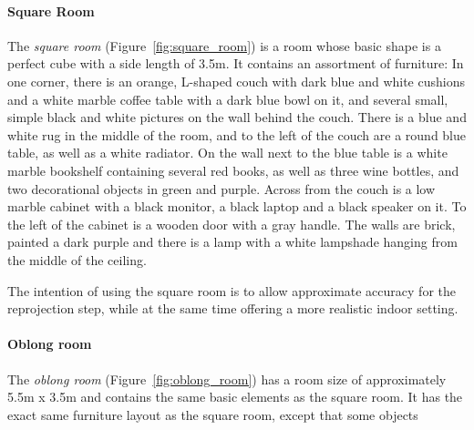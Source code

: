 \paragraph{Square Room}
The \emph{square room} (Figure~\ref{fig:square_room}) is a room whose basic shape is a perfect cube with a side length of 3.5m. It contains an assortment of furniture\footnotemark: In one corner, there is an orange, L-shaped couch with dark blue and white cushions and a white marble coffee table with a dark blue bowl on it, and several small, simple black and white pictures on the wall behind the couch. There is a blue and white rug in the middle of the room, and to the left of the couch are a round blue table, as well as a white radiator. On the wall next to the blue table is a white marble bookshelf containing several red books, as well as three wine bottles, and two decorational objects in green and purple. Across from the couch is a low marble cabinet with a black monitor, a black laptop and a black speaker on it. To the left of the cabinet is a wooden door with a gray handle. The walls are brick, painted a dark purple and there is a lamp with a white lampshade hanging from the middle of the ceiling.


The intention of using the square room is to allow approximate accuracy for the reprojection step, while at the same time offering a more realistic indoor setting.

\paragraph{Oblong room}
The \emph{oblong room} (Figure~\ref{fig:oblong_room}) has a room size of approximately 5.5m x 3.5m and contains the same basic elements as the square room. It has the exact same furniture layout as the square room, except that some objects 



